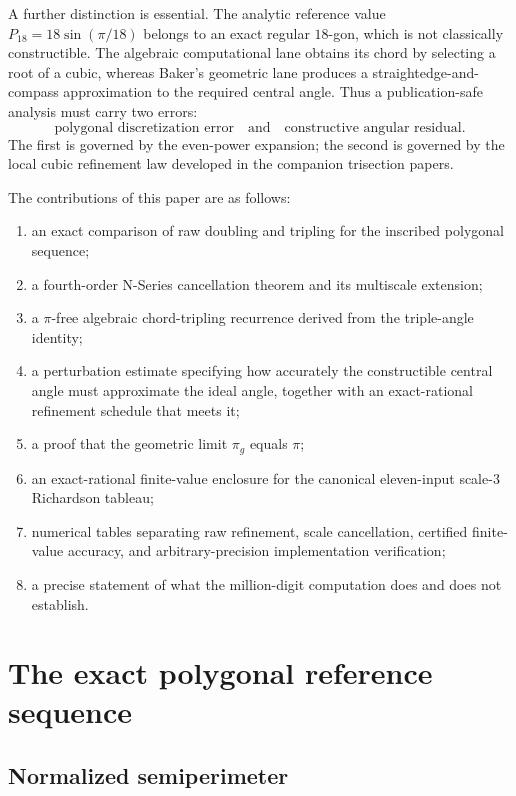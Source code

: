 \documentclass[12pt]{article}
\theoremstyle{definition}
\theoremstyle{remark}
\begin{document}
A further distinction is essential.  The analytic reference value
$P_{18}=18\sin(\pi/18)$ belongs to an exact regular $18$-gon, which is not
classically constructible.  The algebraic computational lane obtains its chord
by selecting a root of a cubic, whereas Baker's geometric lane produces a
straightedge-and-compass approximation to the required central angle.  Thus a
publication-safe analysis must carry two errors:
\[
  \text{polygonal discretization error}
  \quad\text{and}\quad
  \text{constructive angular residual}.
\]
The first is governed by the even-power expansion; the second is governed by
the local cubic refinement law developed in the companion trisection papers.

The contributions of this paper are as follows:
\begin{enumerate}
  \item an exact comparison of raw doubling and tripling for the inscribed
        polygonal sequence;
  \item a fourth-order N-Series cancellation theorem and its multiscale
        extension;
  \item a $\pi$-free algebraic chord-tripling recurrence derived from the
        triple-angle identity;
  \item a perturbation estimate specifying how accurately the constructible
        central angle must approximate the ideal angle, together with an
        exact-rational refinement schedule that meets it;
  \item a proof that the geometric limit $\pi_g$ equals $\pi$;
  \item an exact-rational finite-value enclosure for the canonical eleven-input
        scale-$3$ Richardson tableau;
  \item numerical tables separating raw refinement, scale cancellation,
        certified finite-value accuracy, and arbitrary-precision implementation
        verification;
  \item a precise statement of what the million-digit computation does and
        does not establish.
\end{enumerate}

\section{The exact polygonal reference sequence}

\subsection{Normalized semiperimeter}
\end{document}
